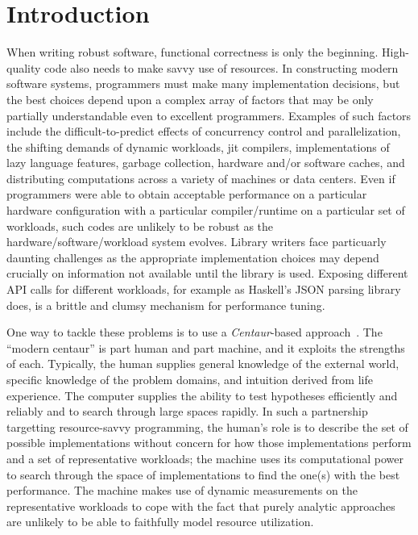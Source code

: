 



\section{Introduction}
When writing robust software, functional correctness is only the
beginning.  
High-quality code also needs to make savvy use of resources.  
In constructing modern software systems, 
programmers must make many implementation decisions, but
the best choices depend upon a complex array of factors that may be
only partially understandable even to excellent programmers.
Examples of such factors include the difficult-to-predict effects of 
concurrency control and parallelization,
the shifting demands of dynamic workloads,  
jit compilers, 
implementations of lazy language features,
garbage collection,
hardware and/or software caches, and
distributing computations across a variety of machines or data
centers.
%
Even if programmers were able to obtain acceptable performance on a
particular hardware configuration with a particular compiler/runtime 
on a particular set of workloads, such codes are unlikely to
be robust as the hardware/software/workload system evolves.
%
Library writers face particuarly daunting challenges as the
appropriate implementation choices may depend crucially on information
not available until the library is used.  Exposing different API calls
for different workloads, for example as Haskell's JSON parsing library
does, is a brittle and clumsy mechanism for performance tuning.

One way to tackle these problems is to use a
\emph{Centaur}-based approach~\cite{centaur}.
The ``modern centaur'' is part human and part machine, and it exploits
the strengths of each.  Typically, the human supplies general
knowledge of the external world, specific knowledge of the problem
domains, and intuition derived from life experience.
The computer supplies the ability to test hypotheses efficiently and
reliably and to search through large spaces rapidly.  
In such a partnership targetting resource-savvy programming, 
the human's role is to describe the set of
possible implementations without concern for how those implementations
perform and a set of representative workloads; 
the machine uses its computational power to search through
the space of implementations to find the one(s) with the best performance.
The machine makes use of dynamic measurements on the representative
workloads to cope with the fact that purely analytic approaches are
unlikely to be able to faithfully model resource utilization.

